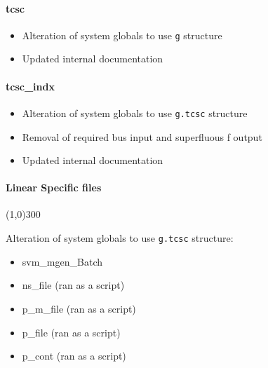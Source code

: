 \documentclass[12pt]{article}
\begin{document}
\paragraph{tcsc}
	\begin{itemize}
		\item Alteration of system globals to use \verb|g| structure
		\item Updated internal documentation
	\end{itemize}
	
\paragraph{tcsc\_indx}
	\begin{itemize}
		\item Alteration of system globals to use \verb|g.tcsc| structure
		\item Removal of required bus input and superfluous f output
		\item Updated internal documentation
	\end{itemize}
		
\paragraph{Linear Specific files}\line(1,0){300}

Alteration of system globals to use \verb|g.tcsc| structure:

	\begin{itemize}
		\item svm\_mgen\_Batch
		\item ns\_file (ran as a script)
		\item p\_m\_file (ran as a script)
		\item p\_file (ran as a script)
		\item p\_cont (ran as a script)
	\end{itemize}
	
	
\end{document}
